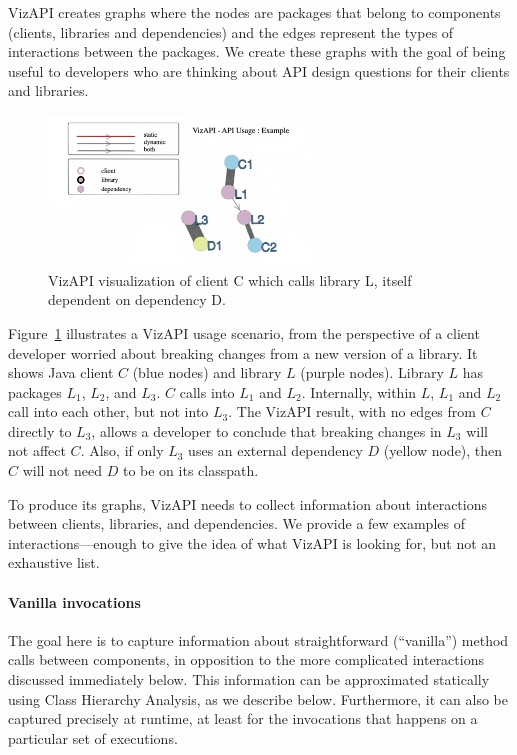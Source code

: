 VizAPI creates graphs where the nodes are packages that belong to components (clients, libraries and dependencies) and the edges represent the types of interactions between the packages. We create these graphs with the goal of being useful to developers who are thinking about API design questions for their clients and libraries.

\begin{figure}[h]
\begin{center}
\includegraphics[height=4cm,width=7cm]{images/intro-example.png}
\caption{VizAPI visualization of client C which calls library L, itself dependent on dependency D.}
\label{fig:example}
\end{center}
\end{figure}

Figure~\ref{fig:example} illustrates a VizAPI usage scenario, from the perspective of a client developer worried about breaking changes from a new version of a library. It shows Java client $C$ (blue nodes) and library $L$ (purple nodes). Library $L$ has packages $L_1$, $L_2$, and $L_3$. $C$ calls into $L_1$ and $L_2$. Internally, within $L$, $L_1$ and $L_2$ call into each other, but not into $L_3$. The VizAPI result, with no edges from $C$ directly to $L_3$, allows a developer to conclude that breaking changes in $L_3$ will not affect $C$. Also, if only $L_3$ uses an external dependency $D$ (yellow node), then $C$ will not need $D$ to be on its classpath.

To produce its graphs, VizAPI needs to collect information about interactions between clients, libraries, and dependencies. We provide a few examples of interactions---enough to give the idea of what VizAPI is looking for, but not an exhaustive list.

\paragraph{Vanilla invocations} The goal here is to capture information about straightforward (``vanilla'') method calls between components, in opposition to the more complicated interactions discussed immediately below. This information can be approximated statically using Class Hierarchy Analysis, as we describe below. Furthermore, it can also be captured precisely at runtime, at least for the invocations that happens on a particular set of executions.

